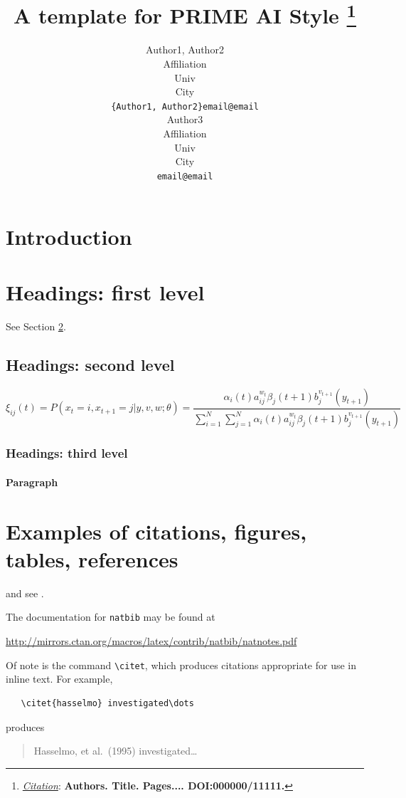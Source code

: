 \documentclass{article}
\title{A template for PRIME AI Style
\thanks{\textit{\underline{Citation}}: 
\textbf{Authors. Title. Pages.... DOI:000000/11111.}} 
}
\author{
  Author1, Author2 \\
  Affiliation \\
  Univ \\
  City\\
  \texttt{\{Author1, Author2\}email@email} \\
   \And
  Author3 \\
  Affiliation \\
  Univ \\
  City\\
  \texttt{email@email} \\
}
\begin{document}
\maketitle


\begin{abstract}
\lipsum[1]
\end{abstract}




\section{Introduction}
\lipsum[2]
\lipsum[3]


\section{Headings: first level}
\label{sec:headings}

\lipsum[4] See Section \ref{sec:headings}.

\subsection{Headings: second level}
\lipsum[5]
\begin{equation}
\xi _{ij}(t)=P(x_{t}=i,x_{t+1}=j|y,v,w;\theta)= {\frac {\alpha _{i}(t)a^{w_t}_{ij}\beta _{j}(t+1)b^{v_{t+1}}_{j}(y_{t+1})}{\sum _{i=1}^{N} \sum _{j=1}^{N} \alpha _{i}(t)a^{w_t}_{ij}\beta _{j}(t+1)b^{v_{t+1}}_{j}(y_{t+1})}}
\end{equation}

\subsubsection{Headings: third level}
\lipsum[6]

\paragraph{Paragraph}
\lipsum[7]

\section{Examples of citations, figures, tables, references}
\label{sec:others}
\lipsum[8] \cite{kour2014real,kour2014fast} and see \cite{hadash2018estimate}.

The documentation for \verb+natbib+ may be found at
\begin{center}
  \url{http://mirrors.ctan.org/macros/latex/contrib/natbib/natnotes.pdf}
\end{center}
Of note is the command \verb+\citet+, which produces citations
appropriate for use in inline text.  For example,
\begin{verbatim}
   \citet{hasselmo} investigated\dots
\end{verbatim}
produces
\begin{quote}
  Hasselmo, et al.\ (1995) investigated\dots
\end{quote}
\end{document}
